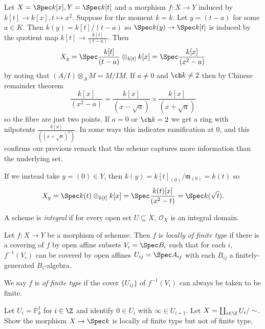 \documentclass[a4paper]{article}
\renewcommand*{\P}{\mathbb{P}}
\newcommand{\sh}[1]{\mathcal{#1}} %
\begin{document}
\begin{eg}
  Let \(X = \Spec k[x], Y = \Spec k[t]\) and a morphism \(f: X \to Y\) induced by \(k[t] \to k[x], t \mapsto x^2\). Suppose for the moment \(k = \overline k\). Let \(y = (t - a)\) for some \(a \in K\). Then \(k(y) = k[t]/(t - a)\) so \(\Spec k(y) \to \Spec k[t]\) is induced by the quotient map \(k[t] \to \frac{k[t]}{(t - a)}\). Then
  \[
    X_y = \Spec \frac{k[t]}{(t - a)} \otimes_{k[t]} k[x] = \Spec \frac{k[x]}{(x^2 - a)}
  \]
  by noting that \((A/I) \otimes_A M = M/IM\). If \(a \neq 0\) and \(\ch k \neq 2\) then by Chinese remainder theorem
  \[
    \frac{k[x]}{(x^2 - a)} = \frac{k[x]}{(x - \sqrt a)} \times \frac{k[x]}{(x + \sqrt a)}
  \]
  so the fibre are just two points. If \(a = 0\) or \(\ch k = 2\) we get a ring with nilpotents \(\frac{k[x]}{((x + \sqrt a)^2)}\). In some ways this indicates ramification at \(0\), and this confirms our previous remark that the scheme captures more information than the underlying set.

    If we instead take \(y = (0) \in Y\), then \(k(y) = k[t]_{(0)}/\mathfrak m_{(0)} = k(t)\) so
    \[
      X_y = \Spec k(t) \otimes_{k[t]} k[x] = \Spec \frac{k(t)[x]}{(x^2 - t)} = \Spec k(\sqrt t).
    \]
\end{eg}

\begin{definition}
  A scheme is \emph{integral} if for every open set \(U \subseteq X\), \(\sh O_X\) is an integral domain.
\end{definition}

\begin{definition}
  Let \(f: X \to Y\) be a morphism of schemse. Then \(f\) is \emph{locally of finite type} if there is a covering of \(f\) by open affine subsets \(V_i = \Spec B_i\) such that for each \(i\), \(f^{-1}(V_i)\) can be covered by open affines \(U_{ij} = \Spec A_{ij}\) with each \(B_{ij}\) a finitely-generated \(B_i\)-algebra.

  We say \(f\) is \emph{of finite type} if the cover \(\{U_{ij}\}\) of \(f^{-1}(V_i)\) can always be taken to be finite.
\end{definition}

\begin{ex}
  Let \(U_i = \P^1_k\) for \(i \in \Z\) and identify \(0 \in U_i\) with \(\infty \in U_{i + 1}\). Let \(X = \coprod_{i \in \Z} U_i/\sim\). Show the morphism \(X \to \Spec k\) is locally of finite type but not of finite type.
\end{ex}
\end{document}
